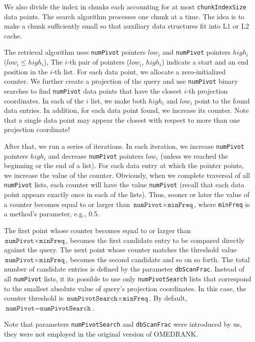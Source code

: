 \documentclass[runningheads,a4paper]{llncs}
\newcommand{\ttt}[1]{\texttt{#1}}
\begin{document}
{We also divide the index in chunks each accounting for at most \ttt{chunkIndexSize} data points.
The search algorithm processes one chunk at a time. The idea is to make a chunk sufficiently small
so that auxiliary data structures fit into L1 or L2  cache.


The retrieval algorithm uses \ttt{numPivot} pointers $low_i$ and \ttt{numPivot} pointers $high_i$ ($low_i \le high_i$),
The \mbox{$i$-th} pair of pointers ($low_i$, $high_i$) indicate a start and an end position in the \mbox{$i$-th} list.
For each data point, we allocate a zero-initialized counter.
We further create a projection of the query and use \ttt{numPivot} binary searches to find 
\ttt{numPivot} data points that have the closest \mbox{$i$-th} projection coordinates.
In each of the $i$ list, we make both $high_i$ and $low_i$ point to the found data entries.
In addition, for each data point found, we increase its counter.
Note that a single data point may appear the closest with respect to more than one projection coordinate!

After that, we run a series of iterations. In each iteration, we increase \ttt{numPivot} pointers $high_i$ and
decrease \ttt{numPivot} pointers $low_i$ (unless we reached the beginning or the end of a list).
For each data entry at which the pointer points, we increase the value of the counter.
Obviously, when we complete traversal of all \ttt{numPivot} lists, each counter will have the value \ttt{numPivot} (recall
that each data point appears exactly once in each of the lists).
Thus, sooner or later the value of a counter becomes equal to or larger than $\ttt{numPivot} \times \ttt{minFreq}$, where \ttt{minFreq}
is a method's parameter, e.g., 0.5.

The first point whose counter becomes equal to or larger than $\ttt{numPivot} \times \ttt{minFreq}$, becomes the first candidate
entry to be compared directly against the query. 
The next point whose counter matches the threshold value $\ttt{numPivot} \times \ttt{minFreq}$, 
becomes the second candidate and so on so forth.
The total number of candidate entries is defined by the parameter \ttt{dbScanFrac}.
Instead of all \ttt{numPivot} lists, it its possible to use only \ttt{numPivotSearch} lists that correspond
to the smallest absolute value of query's projection coordinates. In this case, the counter threshold is  $\ttt{numPivotSearch} \times \ttt{minFreq}$.
By default, $\ttt{numPivot}=\ttt{numPivotSearch}$.

Note that parameters \ttt{numPivotSearch} and \ttt{dbScanFrac}
were introduced by us, they were not employed in the original version of OMEDRANK.


}
\end{document}
